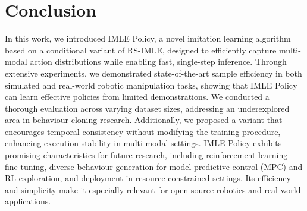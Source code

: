 \section{Conclusion} 
\label{sec:conclusion}


In this work, we introduced IMLE Policy, a novel imitation learning algorithm based on a conditional variant of RS-IMLE, designed to efficiently capture multi-modal action distributions while enabling fast, single-step inference. Through extensive experiments, we demonstrated state-of-the-art sample efficiency in both simulated and real-world robotic manipulation tasks, showing that IMLE Policy can learn effective policies from limited demonstrations. We conducted a thorough evaluation across varying dataset sizes, addressing an underexplored area in behaviour cloning research. Additionally, we proposed a variant that encourages temporal consistency without modifying the training procedure, enhancing execution stability in multi-modal settings. IMLE Policy exhibits promising characteristics for future research, including reinforcement learning fine-tuning, diverse behaviour generation for model predictive control (MPC) and RL exploration, and deployment in resource-constrained settings. Its efficiency and simplicity make it especially relevant for open-source robotics and real-world applications.